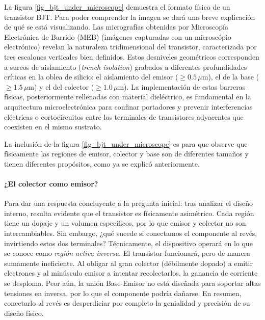 La figura \ref{fig_bjt_under_microscope} demuestra el formato físico de un transistor BJT. Para poder comprender la imagen se dará una breve explicación de qué se está visualizando. Las micrografías obtenidas por Microscopía Electrónica de Barrido (MEB) (imágenes capturadas con un microscópio electrónico) revelan la naturaleza tridimensional del transistor, caracterizada por tres escalones verticales bien definidos. Estos desniveles geométricos corresponden a surcos de aislamiento (\textit{trench isolation}) grabados a diferentes profundidades críticas en la oblea de silicio: el aislamiento del emisor ($\ge 0.5\,\mu\text{m}$), el de la base ($\ge 1.5\,\mu\text{m}$) y el del colector ($\ge 1.0\,\mu\text{m}$). La implementación de estas barreras físicas, posteriormente rellenadas con material dieléctrico, es fundamental en la arquitectura microelectrónica para confinar portadores y prevenir interferencias eléctricas o cortocircuitos entre los terminales de transistores adyacentes que coexisten en el mismo sustrato. 

La inclusión de la figura \ref{fig_bjt_under_microscope} es para que observe que físicamente las regiones de emisor, colector y base son de diferentes tamaños y tienen diferentes propósitos, como ya se explicó anteriormente.

\paragraph{¿El colector como emisor?} Para dar una respuesta concluyente a la pregunta inicial: tras analizar el diseño interno, resulta evidente que el transistor es físicamente asimétrico. Cada región tiene un dopaje y un volumen específicos, por lo que emisor y colector no son intercambiables. Sin embargo, ¿qué sucede si conectamos el componente al revés, invirtiendo estos dos terminales? Técnicamente, el dispositivo operará en lo que se conoce como \emph{región activa inversa}. El transistor funcionará, pero de manera sumamente ineficiente. Al obligar al gran colector (débilmente dopado) a emitir electrones y al minúsculo emisor a intentar recolectarlos, la ganancia de corriente se desploma. Peor aún, la unión Base-Emisor no está diseñada para soportar altas tensiones en inversa, por lo que el componente podría dañarse. En resumen, conectarlo al revés es desperdiciar por completo la genialidad y precisión de su diseño físico.

